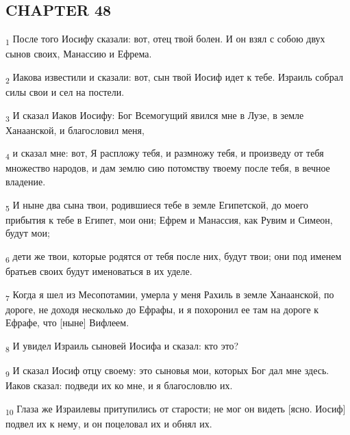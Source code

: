 \subsection{CHAPTER 48}
\begin{tcolorbox}
\textsubscript{1} После того Иосифу сказали: вот, отец твой болен. И он взял с собою двух сынов своих, Манассию и Ефрема.
\end{tcolorbox}
\begin{tcolorbox}
\textsubscript{2} Иакова известили и сказали: вот, сын твой Иосиф идет к тебе. Израиль собрал силы свои и сел на постели.
\end{tcolorbox}
\begin{tcolorbox}
\textsubscript{3} И сказал Иаков Иосифу: Бог Всемогущий явился мне в Лузе, в земле Ханаанской, и благословил меня,
\end{tcolorbox}
\begin{tcolorbox}
\textsubscript{4} и сказал мне: вот, Я распложу тебя, и размножу тебя, и произведу от тебя множество народов, и дам землю сию потомству твоему после тебя, в вечное владение.
\end{tcolorbox}
\begin{tcolorbox}
\textsubscript{5} И ныне два сына твои, родившиеся тебе в земле Египетской, до моего прибытия к тебе в Египет, мои они; Ефрем и Манассия, как Рувим и Симеон, будут мои;
\end{tcolorbox}
\begin{tcolorbox}
\textsubscript{6} дети же твои, которые родятся от тебя после них, будут твои; они под именем братьев своих будут именоваться в их уделе.
\end{tcolorbox}
\begin{tcolorbox}
\textsubscript{7} Когда я шел из Месопотамии, умерла у меня Рахиль в земле Ханаанской, по дороге, не доходя несколько до Ефрафы, и я похоронил ее там на дороге к Ефрафе, что [ныне] Вифлеем.
\end{tcolorbox}
\begin{tcolorbox}
\textsubscript{8} И увидел Израиль сыновей Иосифа и сказал: кто это?
\end{tcolorbox}
\begin{tcolorbox}
\textsubscript{9} И сказал Иосиф отцу своему: это сыновья мои, которых Бог дал мне здесь. Иаков сказал: подведи их ко мне, и я благословлю их.
\end{tcolorbox}
\begin{tcolorbox}
\textsubscript{10} Глаза же Израилевы притупились от старости; не мог он видеть [ясно. Иосиф] подвел их к нему, и он поцеловал их и обнял их.
\end{tcolorbox}
